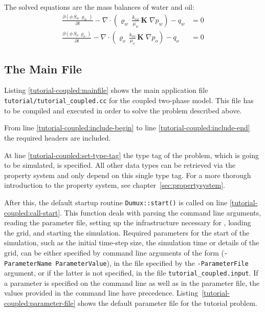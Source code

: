 The solved equations are the mass balances of water and oil:
\begin{align}
  \label{massbalancewater}
  \frac {\partial (\phi \, S_{w}\, \varrho_{w})}{\partial t}
  -
  \nabla \cdot \left( \varrho_{w} \, \frac{k_{rw}}{\mu_{w}} \, \mathbf{K}\;\nabla p_w \right)
  -
  q_w
  & =
  0 \\
  \label{massbalanceoil}
  \frac {\partial (\phi \, S_{o}\, \varrho_{o})}{\partial t}
  -
  \nabla \cdot \left( \varrho_{o} \, \frac{k_{ro}}{\mu_{o}} \, \mathbf{K}\;\nabla p_o \right)
  -
  q_o 
  & =
  0
\end{align}

\subsection{The Main File}

Listing \ref{tutorial-coupled:mainfile} shows the main application file
\texttt{tutorial/tutorial\_coupled.cc} for the coupled two-phase
model. This file has to be compiled and executed in order to solve the problem described
above.

\begin{lst}\label{tutorial-coupled:mainfile} \mbox{}
  
\end{lst}

From line \ref{tutorial-coupled:include-begin} to line
\ref{tutorial-coupled:include-end} the required headers are included.

At line \ref{tutorial-coupled:set-type-tag} the type tag of the
problem, which is going to be simulated, is specified. All other data
types can be retrieved via the \Dumux property system and only depend
on this single type tag. For a more thorough introduction to the
\Dumux property system, see chapter~\ref{sec:propertysystem}.

After this, the default startup routine \texttt{Dumux::start()} is
called on line \ref{tutorial-coupled:call-start}. This function deals
with parsing the command line arguments, reading the parameter file,
setting up the infrastructure necessary for \Dune, loading the grid, and
starting the simulation. 
Required parameters for the start of the simulation, 
such as the initial time-step size, the simulation time or details of the grid,
can be either specified by command line arguments of the form
(\texttt{-ParameterName ParameterValue}), in the file specified by the
\texttt{-ParameterFile} argument, or if the latter is not specified,
in the file \mbox{\texttt{tutorial\_coupled.input}}. 
If a parameter is
specified on the command line as well as in the parameter file, the
values provided in the command line have
precedence. Listing~\ref{tutorial-coupled:parameter-file} shows the
default parameter file for the tutorial problem.

